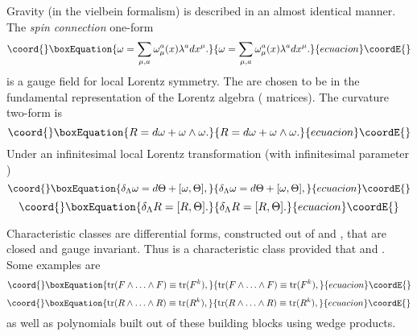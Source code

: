 \documentclass[a4paper,12pt]{article}
\begin{document}
Gravity (in the vielbein formalism) is described in an almost identical manner. The
{\it spin connection} one-form
\begin{equation}\coord{}\boxEquation{
\omega = \sum_{\mu, a} \omega^{a}_{\mu}(x) \lambda^{a} dx^{\mu}.
}{
\omega = \sum_{\mu, a} \omega^{a}_{\mu}(x) \lambda^{a} dx^{\mu}.
}{ecuacion}\coordE{}\end{equation}
is a gauge field for local Lorentz symmetry. The \coordHE{} are chosen to be in
the fundamental representation of the Lorentz algebra (\coordHE{} matrices).
The curvature two-form is
\begin{equation}\coord{}\boxEquation{
R =  d\omega + \omega\wedge \omega.
}{
R =  d\omega + \omega\wedge \omega.
}{ecuacion}\coordE{}\end{equation}
Under an infinitesimal local Lorentz transformation (with
infinitesimal parameter \myHighlight{$\Theta$}\coordHE{})
\begin{equation}\coord{}\boxEquation{
\delta_{\Lambda} \omega = d\Theta + [\omega, \Theta],
}{
\delta_{\Lambda} \omega = d\Theta + [\omega, \Theta],
}{ecuacion}\coordE{}\end{equation}
\begin{equation}\coord{}\boxEquation{
\delta_{\Lambda} R = [R, \Theta].
}{
\delta_{\Lambda} R = [R, \Theta].
}{ecuacion}\coordE{}\end{equation}

Characteristic classes are differential forms, constructed out of
\coordHE{} and \coordHE{}, that are closed and gauge invariant. Thus \coordHE{} is
a characteristic class provided that \coordHE{} and \coordHE{}. Some examples are
\begin{equation}\coord{}\boxEquation{
{\rm tr}(F\wedge \ldots \wedge F) \equiv {\rm tr}(F^k),
}{
{\rm tr}(F\wedge \ldots \wedge F) \equiv {\rm tr}(F^k),
}{ecuacion}\coordE{}\end{equation}
\begin{equation}\coord{}\boxEquation{
{\rm tr}(R\wedge \ldots \wedge R) \equiv {\rm tr}(R^k),
}{
{\rm tr}(R\wedge \ldots \wedge R) \equiv {\rm tr}(R^k),
}{ecuacion}\coordE{}\end{equation}
as well as polynomials built out of these building blocks using wedge products.
\end{document}
